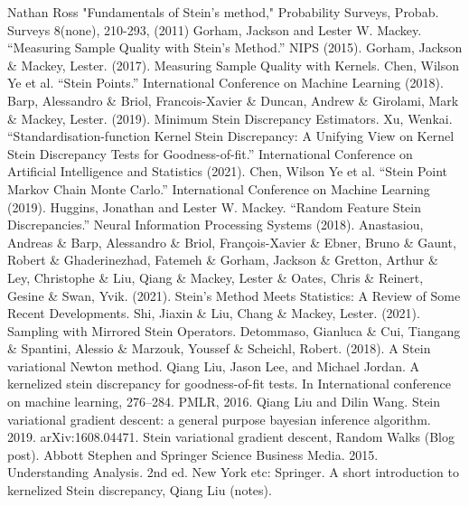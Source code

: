 \documentclass[12pt]{article}
\begin{document}
\begin{thebibliography}{20}
 Nathan Ross "Fundamentals of Stein’s method," Probability Surveys, Probab. Surveys 8(none), 210-293, (2011)
 Gorham, Jackson and Lester W. Mackey. “Measuring Sample Quality with Stein's Method.” NIPS (2015).
 Gorham, Jackson \& Mackey, Lester. (2017). Measuring Sample Quality with Kernels. 
 Chen, Wilson Ye et al. “Stein Points.” International Conference on Machine Learning (2018).
 Barp, Alessandro \& Briol, Francois-Xavier \& Duncan, Andrew \& Girolami, Mark \& Mackey, Lester. (2019). Minimum Stein Discrepancy Estimators. 
 Xu, Wenkai. “Standardisation-function Kernel Stein Discrepancy: A Unifying View on Kernel Stein Discrepancy Tests for Goodness-of-fit.” International Conference on Artificial Intelligence and Statistics (2021).
 Chen, Wilson Ye et al. “Stein Point Markov Chain Monte Carlo.” International Conference on Machine Learning (2019).
 Huggins, Jonathan and Lester W. Mackey. “Random Feature Stein Discrepancies.” Neural Information Processing Systems (2018).
 Anastasiou, Andreas \& Barp, Alessandro \& Briol, François-Xavier \& Ebner, Bruno \& Gaunt, Robert \& Ghaderinezhad, Fatemeh \& Gorham, Jackson \& Gretton, Arthur \& Ley, Christophe \& Liu, Qiang \& Mackey, Lester \& Oates, Chris \& Reinert, Gesine \& Swan, Yvik. (2021). Stein's Method Meets Statistics: A Review of Some Recent Developments. 
 Shi, Jiaxin \& Liu, Chang \& Mackey, Lester. (2021). Sampling with Mirrored Stein Operators. 
 Detommaso, Gianluca \& Cui, Tiangang \& Spantini, Alessio \& Marzouk, Youssef \& Scheichl, Robert. (2018). A Stein variational Newton method. 
 Qiang Liu, Jason Lee, and Michael Jordan. A kernelized stein discrepancy for goodness-of-fit tests. In International conference on machine learning, 276–284. PMLR, 2016.
 Qiang Liu and Dilin Wang. Stein variational gradient descent: a general purpose bayesian inference algorithm. 2019. arXiv:1608.04471.
 Stein variational gradient descent, Random Walks (Blog post).
 Abbott Stephen and Springer Science Business Media. 2015. Understanding Analysis. 2nd ed. New York etc: Springer.
 A short introduction to kernelized Stein discrepancy, Qiang Liu (notes). 
\end{thebibliography}
\end{document}
